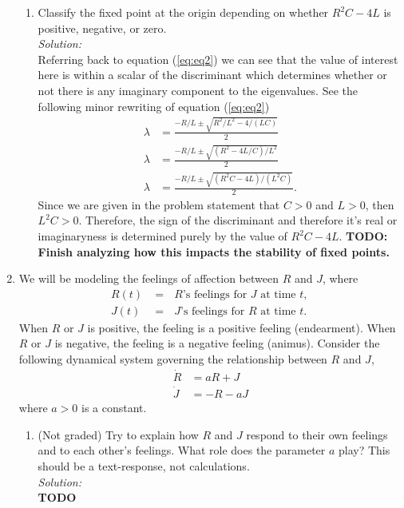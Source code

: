 \documentclass[10pt]{amsart}
\theoremstyle{nonumberplain}
\begin{document}
\begin{enumerate}[label={\bf {\arabic*}:}]
\begin{enumerate}
\item Classify the fixed point at the origin depending on whether $R^2C - 4L$ is positive, negative, or zero. \\
\textit{Solution:} \\
Referring back to equation (\ref{eq:eq2}) we can see that the value of interest here is within a scalar of the discriminant which determines whether or not there is any imaginary component to the eigenvalues.
See the following minor rewriting of equation (\ref{eq:eq2})
\begin{align*}
\lambda &= \frac {-R/L \pm \sqrt{R^2/L^2 - 4/(LC)} }{2} \\
\lambda &= \frac {-R/L \pm \sqrt{(R^2 - 4L/C)/L^2} }{2} \\
\lambda &= \frac {-R/L \pm \sqrt{(R^2C - 4L)/(L^2C)} }{2}.
\end{align*}
Since we are given in the problem statement that $C > 0$ and $L > 0$, then $L^2C > 0$.
Therefore, the sign of the discriminant and therefore it's real or imaginaryness is determined purely by the value of $R^2C - 4L$.
\textbf{TODO: Finish analyzing how this impacts the stability of fixed points.} \\

\end{enumerate}

\newpage

\item We will be modeling the feelings of affection between $R$ and $J$, where
\begin{align*}
R(t) &= \text{ $R$’s feelings for $J$ at time $t$, } \\
J(t) &= \text{ $J$’s feelings for $R$ at time $t$. }
\end{align*}
When $R$ or $J$ is positive, the feeling is a positive feeling (endearment).
When $R$ or $J$ is negative, the feeling is a negative feeling (animus).
Consider the following dynamical system governing the relationship between $R$ and $J$,
\begin{align*}
\dot R &= aR + J \\
\dot J &= -R -a J
\end{align*}
where $a > 0$ is a constant. \\

\begin{enumerate}

\item (Not graded) Try to explain how $R$ and $J$ respond to their own feelings and to each other’s feelings.
What role does the parameter $a$ play?
This should be a text-response, not calculations. \\
\textit{Solution:} \\
\textbf{TODO} \\


\end{enumerate}
\end{enumerate}
\end{document}
